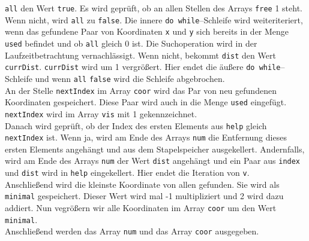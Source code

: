 \documentclass[a4paper,10pt,ngerman]{scrartcl}
\begin{document}
\texttt{all} den Wert \texttt{true}. Es wird geprüft, ob an allen Stellen des Arrays \texttt{free} 1 steht.
Wenn nicht, wird \texttt{all} zu \texttt{false}. Die innere \texttt{do while}--Schleife wird
weiteriteriert, wenn das gefundene Paar von Koordinaten \texttt{x} und \texttt{y} sich bereits
in der Menge \texttt{used} befindet und ob \texttt{all} gleich 0 ist. Die Suchoperation wird in der Laufzeitbetrachtung vernachlässigt.
Wenn nicht, bekommt \texttt{dist} den Wert \texttt{currDist}. \texttt{currDist} wird um 1 vergrößert.
Hier endet die äußere \texttt{do while}--Schleife und wenn \texttt{all} \texttt{false} wird die Schleife abgebrochen.\\
An der Stelle \texttt{nextIndex} im Array \texttt{coor} wird das Par von neu gefundenen Koordinaten gespeichert.
Diese Paar wird auch in die Menge \texttt{used} eingefügt. \texttt{nextIndex} wird im Array \texttt{vis} mit 1 gekennzeichnet.\\
Danach wird geprüft, ob der Index des ersten Elements aus \texttt{help} gleich \texttt{nextIndex} ist.
Wenn ja, wird am Ende des Arrays \texttt{num} die Entfernung dieses ersten Elements angehängt und aus dem Stapelspeicher ausgekellert.
Andernfalls, wird am Ende des Arrays \texttt{num} der Wert \texttt{dist} angehängt und ein Paar aus \texttt{index} und
\texttt{dist} wird in \texttt{help} eingekellert. Hier endet die Iteration von \texttt{v}.\\
Anschließend wird die kleinste Koordinate von allen gefunden. Sie wird als \texttt{minimal} gespeichert.
Dieser Wert wird mal -1 multipliziert und 2 wird dazu addiert. 
Nun vegrößern wir alle Koordinaten im Array \texttt{coor} um den Wert \texttt{minimal}.\\
Anschließend werden das Array \texttt{num} und das Array \texttt{coor} ausgegeben.\\
\end{document}
